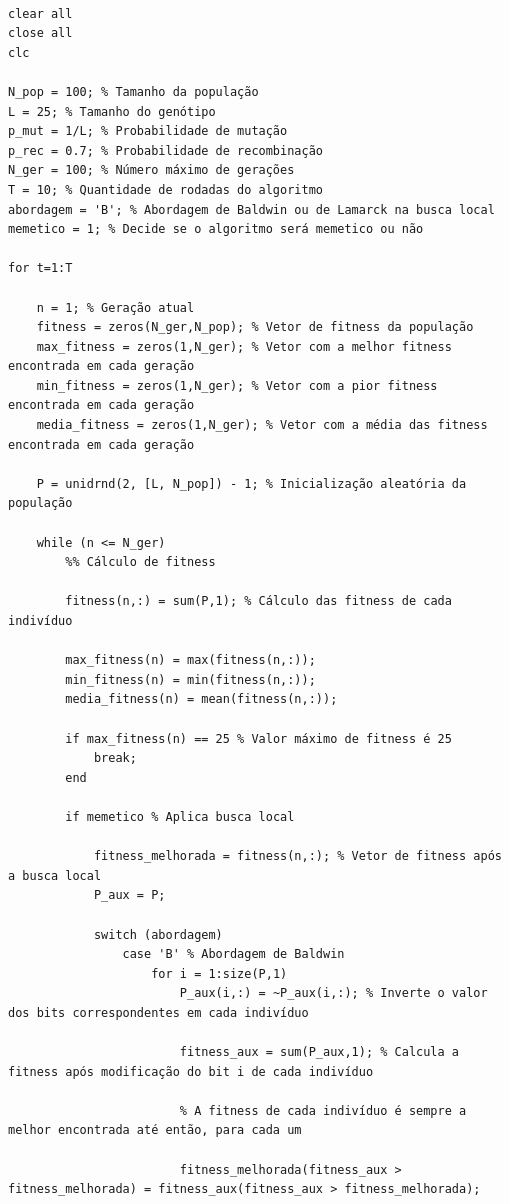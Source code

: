 \documentclass{report}
\begin{document}
\begin{lstlisting}

clear all
close all
clc

N_pop = 100; % Tamanho da população
L = 25; % Tamanho do genótipo
p_mut = 1/L; % Probabilidade de mutação
p_rec = 0.7; % Probabilidade de recombinação
N_ger = 100; % Número máximo de gerações
T = 10; % Quantidade de rodadas do algoritmo
abordagem = 'B'; % Abordagem de Baldwin ou de Lamarck na busca local
memetico = 1; % Decide se o algoritmo será memetico ou não

for t=1:T

    n = 1; % Geração atual
    fitness = zeros(N_ger,N_pop); % Vetor de fitness da população
    max_fitness = zeros(1,N_ger); % Vetor com a melhor fitness encontrada em cada geração
    min_fitness = zeros(1,N_ger); % Vetor com a pior fitness encontrada em cada geração
    media_fitness = zeros(1,N_ger); % Vetor com a média das fitness encontrada em cada geração

    P = unidrnd(2, [L, N_pop]) - 1; % Inicialização aleatória da população

    while (n <= N_ger)
        %% Cálculo de fitness
        
        fitness(n,:) = sum(P,1); % Cálculo das fitness de cada indivíduo
        
        max_fitness(n) = max(fitness(n,:));
        min_fitness(n) = min(fitness(n,:));
        media_fitness(n) = mean(fitness(n,:));

        if max_fitness(n) == 25 % Valor máximo de fitness é 25
            break;
        end
        
        if memetico % Aplica busca local
        
            fitness_melhorada = fitness(n,:); % Vetor de fitness após a busca local
            P_aux = P;
            
            switch (abordagem)
                case 'B' % Abordagem de Baldwin
                    for i = 1:size(P,1)
                        P_aux(i,:) = ~P_aux(i,:); % Inverte o valor dos bits correspondentes em cada indivíduo
                        
                        fitness_aux = sum(P_aux,1); % Calcula a fitness após modificação do bit i de cada indivíduo
                        
                        % A fitness de cada indivíduo é sempre a melhor encontrada até então, para cada um
                        
                        fitness_melhorada(fitness_aux > fitness_melhorada) = fitness_aux(fitness_aux > fitness_melhorada);
                        

\end{lstlisting}
\end{document}

